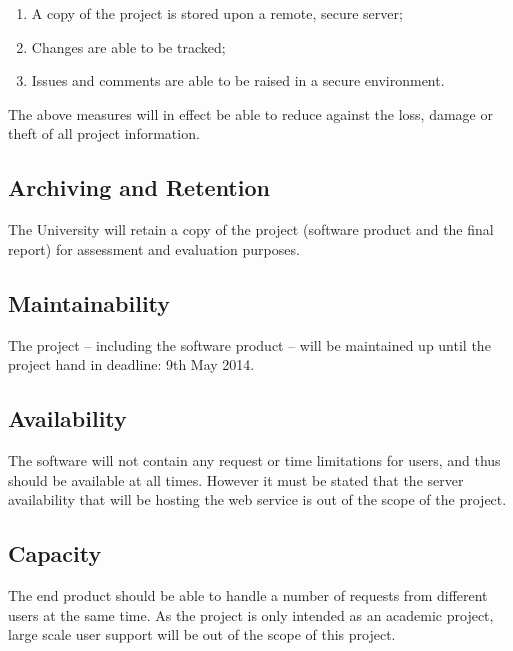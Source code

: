 \begin{enumerate}
  \item A copy of the project is stored upon a remote, secure server;
  \item Changes are able to be tracked;
  \item Issues and comments are able to be raised in a secure environment.
\end{enumerate}

The above measures will in effect be able to reduce against the loss, damage or 
theft of all project information.


\subsection{Archiving and Retention}

The University will retain a copy of the project (software product and the final
report) for assessment and evaluation purposes. 


\subsection{Maintainability}

The project -- including the software product -- will be maintained up until the
project hand in deadline: 9th May 2014.


\subsection{Availability}

The software will not contain any request or time limitations for users, and 
thus should be available at all times. However it must be stated that the server
availability that will be hosting the web service is out of the scope of the 
project.


\subsection{Capacity}

The end product should be able to handle a number of requests from different 
users at the same time. As the project is only intended as an academic project, 
large scale user support will be out of the scope of this project.


